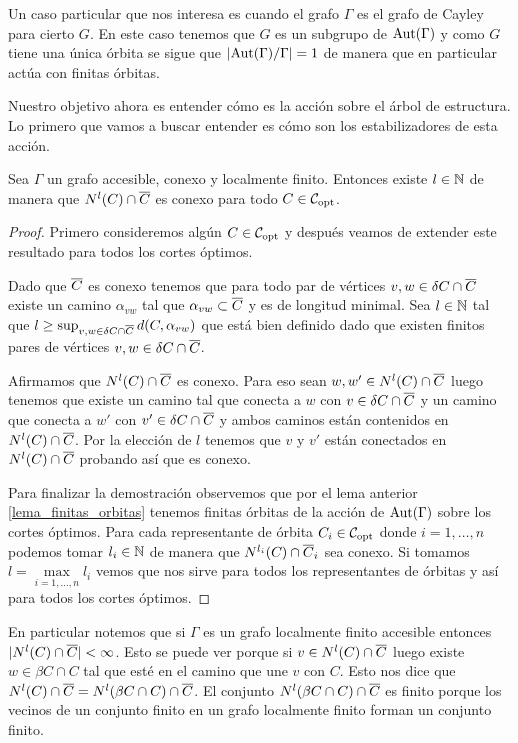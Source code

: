 \documentclass[tesis.tex]{subfiles}
\begin{document}
\begin{obs}
	Un caso particular que nos interesa es cuando el grafo $\Gamma$ es el grafo de Cayley para cierto \fg $G$.
	En este caso tenemos que $G$ es un subgrupo de $\text{Aut}(\Gamma)$ y como $G$ tiene una única órbita se sigue que $|\text{Aut}(\Gamma)/\Gamma| = 1$ de manera que en particular actúa con finitas órbitas.		
\end{obs}

Nuestro objetivo ahora es entender cómo es la acción sobre el árbol de estructura. 
Lo primero que vamos a buscar entender es cómo son los estabilizadores de esta acción.

\begin{lema}\label{lema_nlC_cap_olC_conexo}
	Sea $\Gamma$ un grafo accesible, conexo y localmente finito.
	Entonces existe $l \in \mathbb{N}$ de manera que $N^l(C) \cap \overline C$ es conexo para todo $C \in {\cal C}_{\text{opt}}$.
\end{lema}
\begin{proof}
	Primero consideremos algún $C \in {\cal C}_{\text{opt}}$ y después veamos de extender este resultado para todos los cortes óptimos.
	
	Dado que $\overline C$ es conexo tenemos que para todo par de vértices $v,w \in \delta C \cap \overline C$ existe un camino $\alpha_{vw}$ tal que $\alpha_{vw} \subset \overline C$ y es de longitud minimal.
	Sea $l \in \mathbb{N}$ tal que $l \ge \sup_{v,w \in \delta C \cap \overline C} d(C,\alpha_{vw})$ que está bien definido dado que existen finitos pares de vértices $v,w \in \delta C \cap \overline C$.
	
	Afirmamos que $N^{l}(C) \cap \overline C$ es conexo.
	Para eso sean $w,w' \in N^{l}(C) \cap \overline C$ luego tenemos que existe un camino tal que conecta a $w$ con $v  \in \delta C \cap \overline C$ y un camino que conecta a $w'$ con $v' \in \delta C \cap \overline C$ y ambos caminos están contenidos en $N^{l}(C) \cap \overline C$.
	Por la elección de $l$ tenemos que $v$ y $v'$ están conectados en $N^l(C) \cap \overline C$ probando así que es conexo.
	

	Para finalizar la demostración observemos que por el lema anterior \ref{lema_finitas_orbitas} tenemos finitas órbitas de la acción de $\text{Aut}(\Gamma)$ sobre los cortes óptimos.
	Para cada representante de órbita $C_i \in {\cal C}_{\text{opt}}$ donde $i=1,\dots,n$ podemos tomar $l_i \in \mathbb{N}$ de manera que $ N^{l_{i}}(C_{\textit{}}) \cap \overline C_{i} $ sea conexo. 
	Si tomamos $l = \underset{{i=1,\dots,n}}{\max} l_i$ vemos que nos sirve para todos los representantes de órbitas y así para todos los cortes óptimos.
	
\end{proof}
\begin{obs}
	En particular notemos que si $\Gamma$ es un grafo localmente finito accesible entonces  $|N^l(C) \cap \overline C|<\infty$. 
	Esto se puede ver porque si $v \in N^l(C) \cap \overline C$ luego existe $w \in \beta C \cap C$ tal que esté en el camino que une $v$ con $C$.
	Esto nos dice que $N^l(C) \cap \overline C = N^l(\beta C  \cap C) \cap \overline C$. 
	El conjunto $N^l(\beta C  \cap C) \cap \overline C$ es finito porque los vecinos de un conjunto finito en un grafo localmente finito forman un conjunto finito.
\end{obs}
\end{document}
